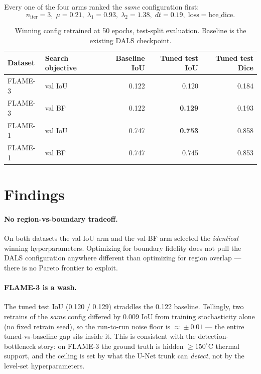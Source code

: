 \documentclass[10pt]{article}
\begin{document}
Every one of the four arms ranked the \emph{same} configuration first:
\[
n_{\text{iter}}\!=\!3,\;\mu\!=\!0.21,\;\lambda_1\!=\!0.93,\;\lambda_2\!=\!1.38,\;
dt\!=\!0.19,\;\text{loss}=\text{bce\_dice}.
\]

\begin{table}[H]
\centering
\caption{Winning config retrained at 50 epochs, test-split evaluation. Baseline
is the existing DALS checkpoint.}
\begin{tabular}{llrrr}
\toprule
Dataset & Search objective & Baseline IoU & Tuned test IoU & Tuned test Dice \\
\midrule
FLAME-3 & val IoU & 0.122 & 0.120 & 0.184 \\
FLAME-3 & val BF  & 0.122 & \textbf{0.129} & 0.193 \\
FLAME-1 & val IoU & 0.747 & \textbf{0.753} & 0.858 \\
FLAME-1 & val BF  & 0.747 & 0.745 & 0.853 \\
\bottomrule
\end{tabular}
\end{table}

\section{Findings}

\paragraph{No region-vs-boundary tradeoff.} On both datasets the val-IoU arm and
the val-BF arm selected the \emph{identical} winning hyperparameters. Optimizing
for boundary fidelity does not pull the DALS configuration anywhere different than
optimizing for region overlap --- there is no Pareto frontier to exploit.

\paragraph{FLAME-3 is a wash.} The tuned test IoU (0.120 / 0.129) straddles the
0.122 baseline. Tellingly, two retrains of the \emph{same} config differed by
0.009 IoU from training stochasticity alone (no fixed retrain seed), so the
run-to-run noise floor is $\approx\!\pm0.01$ --- the entire tuned-vs-baseline gap
sits inside it. This is consistent with the detection-bottleneck story: on
FLAME-3 the ground truth is hidden $\ge150^\circ$C thermal support, and the
ceiling is set by what the U-Net trunk can \emph{detect}, not by the level-set
hyperparameters.
\end{document}
